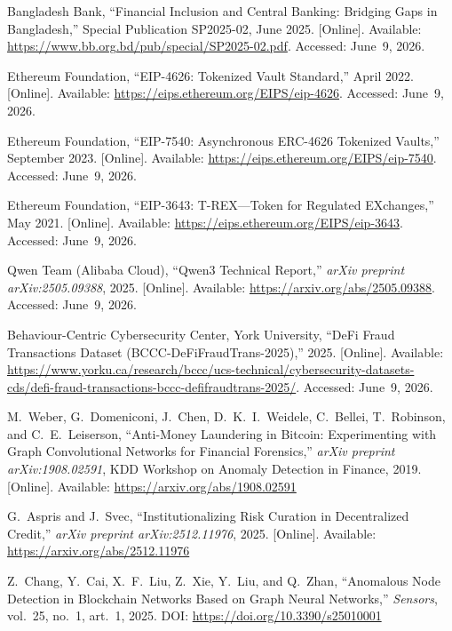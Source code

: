 \documentclass[12pt, a4paper]{report}
\begin{document}
{\begin{enumerate}[label={[\arabic*]}]
\item Bangladesh Bank, ``Financial Inclusion and Central Banking: Bridging Gaps in Bangladesh,'' Special Publication SP2025-02, June 2025. [Online]. Available: \url{https://www.bb.org.bd/pub/special/SP2025-02.pdf}. Accessed: June~9, 2026.

\item Ethereum Foundation, ``EIP-4626: Tokenized Vault Standard,'' April 2022. [Online]. Available: \url{https://eips.ethereum.org/EIPS/eip-4626}. Accessed: June~9, 2026.

\item Ethereum Foundation, ``EIP-7540: Asynchronous ERC-4626 Tokenized Vaults,'' September 2023. [Online]. Available: \url{https://eips.ethereum.org/EIPS/eip-7540}. Accessed: June~9, 2026.

\item Ethereum Foundation, ``EIP-3643: T-REX---Token for Regulated EXchanges,'' May 2021. [Online]. Available: \url{https://eips.ethereum.org/EIPS/eip-3643}. Accessed: June~9, 2026.

\item Qwen Team (Alibaba Cloud), ``Qwen3 Technical Report,'' \textit{arXiv preprint arXiv:2505.09388}, 2025. [Online]. Available: \url{https://arxiv.org/abs/2505.09388}. Accessed: June~9, 2026.

\item Behaviour-Centric Cybersecurity Center, York University, ``DeFi Fraud Transactions Dataset (BCCC-DeFiFraudTrans-2025),'' 2025. [Online]. Available: \url{https://www.yorku.ca/research/bccc/ucs-technical/cybersecurity-datasets-cds/defi-fraud-transactions-bccc-defifraudtrans-2025/}. Accessed: June~9, 2026.

\item M.~Weber, G.~Domeniconi, J.~Chen, D.~K.~I.~Weidele, C.~Bellei, T.~Robinson, and C.~E.~Leiserson, ``Anti-Money Laundering in Bitcoin: Experimenting with Graph Convolutional Networks for Financial Forensics,'' \textit{arXiv preprint arXiv:1908.02591}, KDD Workshop on Anomaly Detection in Finance, 2019. [Online]. Available: \url{https://arxiv.org/abs/1908.02591}

\item G.~Aspris and J.~Svec, ``Institutionalizing Risk Curation in Decentralized Credit,'' \textit{arXiv preprint arXiv:2512.11976}, 2025. [Online]. Available: \url{https://arxiv.org/abs/2512.11976}

\item Z.~Chang, Y.~Cai, X.~F.~Liu, Z.~Xie, Y.~Liu, and Q.~Zhan, ``Anomalous Node Detection in Blockchain Networks Based on Graph Neural Networks,'' \textit{Sensors}, vol.~25, no.~1, art.~1, 2025. DOI: \url{https://doi.org/10.3390/s25010001}


\end{enumerate}}
\end{document}
